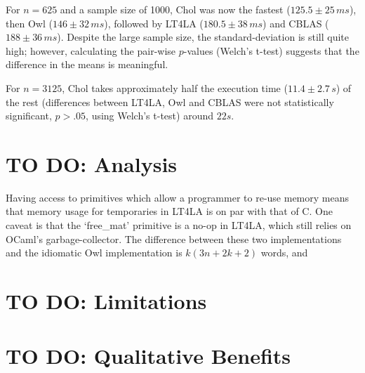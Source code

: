 For $n=625$ and a sample size of 1000, Chol was now the fastest ($125.5 \pm
25\,ms$), then Owl ($146 \pm 32 \,ms$), followed by LT4LA ($180.5 \pm 38 \,ms$)
and CBLAS ($188 \pm 36 \, ms$). Despite the large sample size, the
standard-deviation is still quite high; however, calculating the pair-wise
$p$-values (Welch's t-test) suggests that the difference in the means is meaningful.

For $n=3125$, Chol takes approximately half the execution time ($11.4 \pm 2.7
\,s$) of the rest (differences between LT4LA, Owl and CBLAS were not
statistically significant, $p>.05$, using Welch's t-test) around $22s$.

\section{TO DO: Analysis}

Having access to primitives which allow a programmer to re-use memory means
that memory usage for temporaries in LT4LA is on par with that of C. One caveat
is that the `free\_mat' primitive is a no-op in LT4LA, which still relies on
OCaml's garbage-collector. The difference between these two implementations
and the idiomatic Owl implementation is $k(3n+2k+2)$ words, and 

\section{TO DO: Limitations}

\section{TO DO: Qualitative Benefits}

